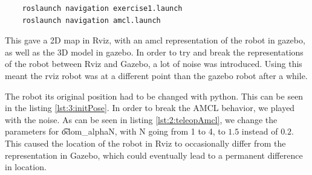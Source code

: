 \begin{lstlisting}
	roslaunch navigation exercise1.launch
	roslaunch navigation amcl.launch
\end{lstlisting}

This gave a 2D map in Rviz, with an amcl representation of the robot in gazebo, as well as the 3D model in gazebo. In order to try and break the representations of the robot between Rviz and Gazebo, a lot of noise was introduced. Using this meant the rviz robot was at a different point than the gazebo robot after a while.





The robot its original position had to be changed with python. This can be seen in the listing \ref{lst:3:initPose}. In order to break the AMCL behavior, we played with the noise. As can be seen in listing \ref{lst:2:teleopAmcl}, we change the parameters for \t{odom_alphaN}, with N going from 1 to 4, to $1.5$ instead of $0.2$. This caused the location of the robot in Rviz to occasionally differ from the representation in Gazebo, which could eventually lead to a permanent difference in location.